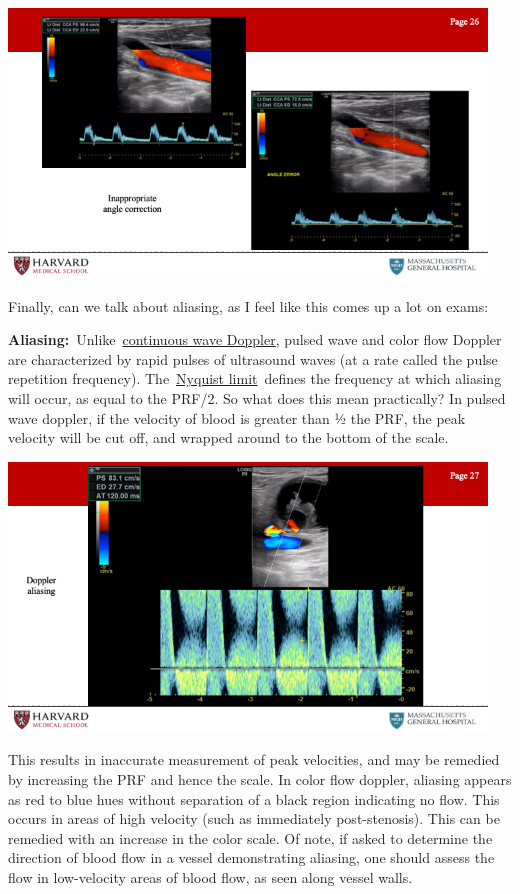 \documentclass[
]{book}
\begin{document}
\includegraphics[width=5in]{images/vasc_lab/Slide27}

Finally, can we talk about aliasing, as I feel like this comes up a lot
on exams:

\textbf{Aliasing:}~Unlike~\href{https://radiopaedia.org/articles/continuous-wave-doppler?lang=us}{continuous wave
Doppler},
pulsed wave and color flow Doppler are characterized by rapid pulses of
ultrasound waves (at a rate called the pulse repetition frequency).
The~\href{https://radiopaedia.org/articles/nyquist-limit?lang=us}{Nyquist
limit}~defines
the frequency at which aliasing will occur, as equal to the PRF/2. So
what does this mean practically? In pulsed wave doppler, if the velocity
of blood is greater than ½ the PRF, the peak velocity will be cut off,
and wrapped around to the bottom of the scale.

\includegraphics[width=5in]{images/vasc_lab/Slide28}

This results in inaccurate measurement of peak velocities, and may be
remedied by increasing the PRF and hence the scale. In color flow
doppler, aliasing appears as red to blue hues without separation of a
black region indicating no flow. This occurs in areas of high velocity
(such as immediately post-stenosis). This can be remedied with an
increase in the color scale. Of note, if asked to determine the
direction of blood flow in a vessel demonstrating aliasing, one should
assess the flow in low-velocity areas of blood flow, as seen along
vessel walls.
\end{document}
